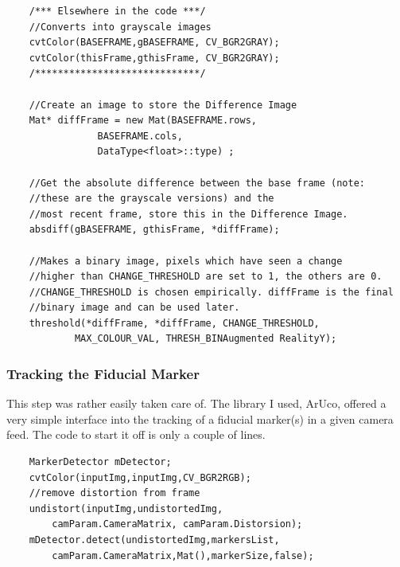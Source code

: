 \documentclass[11pt]{article}
\begin{document}
\begin{lstlisting}
	/*** Elsewhere in the code ***/
	//Converts into grayscale images
	cvtColor(BASEFRAME,gBASEFRAME, CV_BGR2GRAY);
	cvtColor(thisFrame,gthisFrame, CV_BGR2GRAY);
	/*****************************/

	//Create an image to store the Difference Image
  	Mat* diffFrame = new Mat(BASEFRAME.rows, 
  				BASEFRAME.cols,
  				DataType<float>::type) ;
	
	//Get the absolute difference between the base frame (note:
	//these are the grayscale versions) and the 
	//most recent frame, store this in the Difference Image.  				
  	absdiff(gBASEFRAME, gthisFrame, *diffFrame);	
  	
  	//Makes a binary image, pixels which have seen a change
  	//higher than CHANGE_THRESHOLD are set to 1, the others are 0.
  	//CHANGE_THRESHOLD is chosen empirically. diffFrame is the final
  	//binary image and can be used later.
  	threshold(*diffFrame, *diffFrame, CHANGE_THRESHOLD, 
  			MAX_COLOUR_VAL, THRESH_BINAugmented RealityY);
\end{lstlisting}

\subsubsection{Tracking the Fiducial Marker}
This step was rather easily taken care of. The library I used, ArUco, 
offered a very simple interface into the tracking of a fiducial marker(s)
in a given camera feed. The code to start it off is only a couple of 
lines.

\begin{lstlisting}
	MarkerDetector mDetector;
	cvtColor(inputImg,inputImg,CV_BGR2RGB);
	//remove distortion from frame
	undistort(inputImg,undistortedImg, 
		camParam.CameraMatrix, camParam.Distorsion);
	mDetector.detect(undistortedImg,markersList, 
		camParam.CameraMatrix,Mat(),markerSize,false);
\end{lstlisting}
\end{document}
